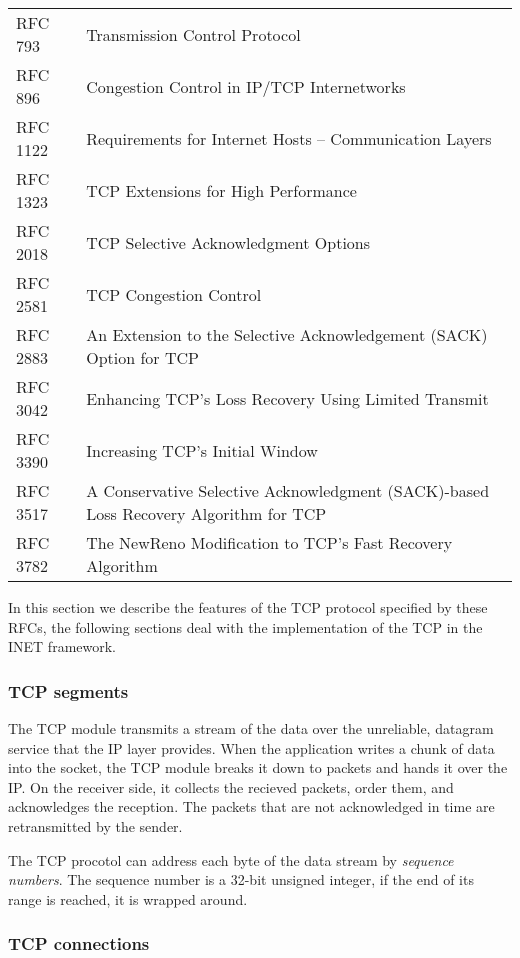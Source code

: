\begin{tabular}{ll}
RFC 793 & Transmission Control Protocol \\
RFC 896 & Congestion Control in IP/TCP Internetworks \\
RFC 1122 & Requirements for Internet Hosts -- Communication Layers \\
RFC 1323 & TCP Extensions for High Performance \\
RFC 2018 & TCP Selective Acknowledgment Options \\
RFC 2581 & TCP Congestion Control \\
RFC 2883 & An Extension to the Selective Acknowledgement (SACK) Option for TCP \\
RFC 3042 & Enhancing TCP's Loss Recovery Using Limited Transmit \\
RFC 3390 & Increasing TCP's Initial Window \\
RFC 3517 & A Conservative Selective Acknowledgment (SACK)-based Loss Recovery \newline
                 Algorithm for TCP \\
RFC 3782 & The NewReno Modification to TCP's Fast Recovery Algorithm \\
\end{tabular}

In this section we describe the features of the TCP protocol specified by these RFCs,
the following sections deal with the implementation of the TCP in the INET framework.

\subsubsection{TCP segments}

The TCP module transmits a stream of the data over the unreliable, datagram service
that the IP layer provides. When the application writes a chunk of data into the socket,
the TCP module breaks it down to packets and hands it over the IP. On the receiver side,
it collects the recieved packets, order them, and acknowledges the reception. The packets
that are not acknowledged in time are retransmitted by the sender.

The TCP procotol can address each byte of the data stream by \emph{sequence numbers}.
The sequence number is a 32-bit unsigned integer, if the end of its range is reached,
it is wrapped around.


\subsubsection{TCP connections}

